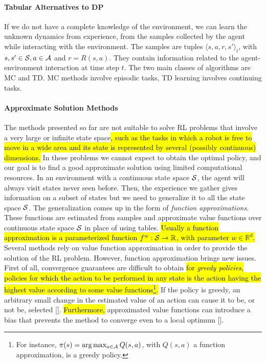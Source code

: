 \paragraph{Tabular Alternatives to DP}\label{subsec:alt}
If we do not have a complete knowledge of the environment, we can learn the unknown dynamics from experience, \ie from the samples collected by the agent while interacting with the environment. The samples are tuples $\langle s,a,r,s' \rangle_t$, with $s, s' \in \mathcal{S}, a \in \mathcal{A}$ and $r = R(s,a)$. They contain information related to the agent-environment interaction at time step $t$. The two main classes of algorithms are \acf{MC} and \acf{TD}. \ac{MC} methods involve episodic tasks, \ac{TD} learning involves continuing tasks. 

\paragraph{Approximate Solution Methods}
The methods presented so far are not suitable to solve \ac{RL} problems that involve a very large or infinite state space\hl{, such as the tasks in which a robot is free to move in a wide area and its state is represented by several (possibly continuous) dimensions.} In these problems we cannot expect to obtain the optimal policy, and our goal is to find a good approximate solution using limited computational resources. In an environment with a continuous state space $\mathcal{S}$, the agent will always visit states never seen before. Then, the experience we gather gives information on a subset of states but we need to generalize it to all the state space $\mathcal{S}$. The generalization comes up in the form of \emph{function approximations}. These functions are estimated from samples and approximate value functions over continuous state space $\mathcal{S}$ in place of using tables. \hl{Usually a function approximation is a parameterized function $f^{w}: \mathcal{S} \to \mathbb{R}$, with parameter $w \in \mathbb{R}^{d}$.}\\
\newline
Several methods rely on value function approximation in order to provide the solution of the \ac{RL} problem. However, function approximation brings new issues. First of all, convergence guarantees are difficult to obtain \hl{for \emph{greedy policies},} \ie \hl{policies for which the action to be performed in any state is the action having the highest value according to some value functions\footnote{For instance, $\pi(s) = \arg \max_{a \in \mathcal{A}}Q(s,a)$, with $Q(s,a)$ a function approximation, is a greedy policy.}.} If the policy is greedy, an arbitrary small change in the estimated value of an action can cause it to be, or not be, selected [\cite{Sutton1999PolicyGM}]. \hl{Furthermore,} approximated value functions can introduce a bias that prevents the method to converge even to a local optimum [\cite{deisenroth2013Survey}]. 

